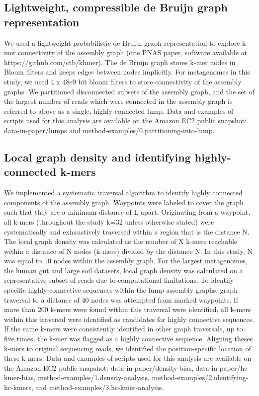 \documentclass[10pt]{article}
\begin{document}
\subsection*{Lightweight, compressible de Bruijn graph representation}
We used a lightweight probabilistic de Bruijn graph representation to explore k-mer connectivity of the assembly graph (cite PNAS paper, software available at https://github.com/ctb/khmer). The de Bruijn graph stores k-mer nodes in Bloom filters and keeps edges between nodes implicitly.  For metagenomes in this study, we used 4 x 48e9 bit bloom filters to store connectivity of the assembly graphs.  We partitioned disconnected subsets of the assembly graph, and the set of the largest number of reads which were connected in the assembly graph is referred to above as a single, highly-connected lump.  Data and examples of scripts used for this analysis are available on the Amazon EC2 public snapshot:  data-in-paper/lumps and method-examples/0.partitioning-into-lump.

\subsection*{Local graph density and identifying highly-connected k-mers}
We implemented a systematic traversal algorithm to identify highly connected components of the assembly graph.  Waypoints were labeled to cover the graph such that they are a minimum distance of L apart. Originating from a waypoint, all k-mers (throughout the study k=32 unless otherwise stated) were systematically and exhaustively traversed within a region that is the distance N.  The local graph density was calculated as the number of X k-mers reachable within a distance of N nodes (k-mers) divided by the distance N.  In this study, N was equal to 10 nodes within the assembly graph.  For the largest metagenomes, the human gut and large soil datasets, local graph density was calculated on a representative subset of reads due to computational limitations.  To identify specific highly-connective sequences within the lump assembly graphs, graph traversal to a distance of 40 nodes was attempted from marked waypoints.  If more than 200 k-mers were found within this traversal were identified, all k-mers within this traversal were identified as candidates for highly connective sequences.  If the same k-mers were consistently identified in other graph traversals, up to five times, the k-mer was flagged as a highly connective sequence.  Aligning theses k-mers to original sequencing reads, we identified the position-specific location of these k-mers.  Data and examples of scripts used for this analysis are available on the Amazon EC2 public snapshot: data-in-paper/density-bias, data-in-paper/hc-kmer-bias, method-examples/1.density-analysis, method-examples/2.identifying-hc-kmers, and method-examples/3.hc-kmer-analysis.
\end{document}
